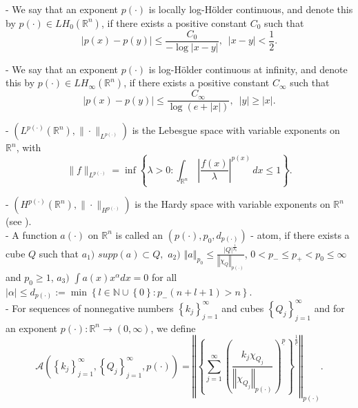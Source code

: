 \documentclass[oneside,10pt]{article}
\begin{document}
- We say that an exponent $p(\cdot)$ is locally log-H\"{o}lder continuous, and denote this by $p(\cdot)\in LH_{0}(\mathbb{R}^{n})$, if there exists a positive constant $C_{0}$ such that
\[
\left\vert p(x)-p(y)\right\vert \leq\frac{C_{0}}{-\log\left\vert
x-y\right\vert }, \,\,\, \left\vert
x-y\right\vert <\frac{1}{2}.
\]

- We say that an exponent $p(\cdot)$ is log-H\"{o}lder continuous at infinity, and denote this by $p(\cdot)\in LH_{\infty}(\mathbb{R}^{n})$, if there exists a positive constant $C_{\infty}$ such that
\[
\left\vert p(x)-p(y)\right\vert \leq\frac{C_{\infty}}{\log\left(  e+\left\vert
x\right\vert \right)  }, \,\,\, \left\vert
y\right\vert \geq \left\vert x \right\vert.
\]

- $\left( L^{p(\cdot)}(\mathbb{R}^n), \| \cdot \|_{L^{p(\cdot)}} \right)$ is the Lebesgue space with variable exponents on $\mathbb{R}^n$, with
\[
\| f \|_{L^{p(\cdot)}} = \inf \left\{ \lambda > 0 : \int_{\mathbb{R}^{n}} \, \left| \frac{f(x)}{\lambda} \right|^{p(x)} \, dx \leq 1 \right\}.
\] 

- $\left( H^{p(\cdot)}(\mathbb{R}^n), \| \cdot \|_{H^{p(\cdot)}} \right)$ is the Hardy space with variable exponents on $\mathbb{R}^n$ (see \cite{Nakai}). \\

- A function $a(\cdot)$ on $\mathbb{R}^{n}$ is called an $(p(\cdot),p_{0},d_{p(\cdot)})$ - atom, if there exists a cube $Q$ such that\newline
$a_{1})$ $\textit{supp}\left( a\right) \subset Q,$\newline
$a_{2})$ $\left\Vert a\right\Vert _{p_{0}}\leq \frac{\left\vert Q\right\vert
^{\frac{1}{p_{0}}}}{\left\Vert \chi _{Q}\right\Vert _{p(\cdot)}}$, $0 < p_{-} \leq  p_{+} < p_{0} \leq \infty $ and $p_{0} \geq 1$, \newline
$a_{3})$ $\int a(x)x^{\alpha }dx=0$ for all $\left\vert \alpha \right\vert
\leq d_{p(\cdot)} := \min \left\{ l\in \mathbb{N\cup }\left\{ 0\right\} : p_{-}(n+l+1)>n\right\}.$ \\

- For sequences of nonnegative numbers $\left\{ k_{j}\right\} _{j=1}^{\infty }$
and cubes $\left\{ Q_{j}\right\} _{j=1}^{\infty }$ and for an exponent $p(\cdot):
\mathbb{R}^{n}\rightarrow \left( 0,\infty \right) $, we define
\[
\mathcal{A}\left( \left\{ k_{j}\right\}_{j=1}^{\infty },\left\{Q_{j}\right\}_{j=1}^{\infty }, p(\cdot)\right) =
\left\Vert \left\{\sum\limits_{j=1}^{\infty }\left( \frac{k_{j}\chi _{Q_{j}}}{\left\Vert \chi_{Q_{j}}\right\Vert_{p(\cdot)}} 
\right)^{\underline{p}}\right\}^{\frac{1}{\underline{p}}}\right\Vert_{p(\cdot)}.
\]
\end{document}
